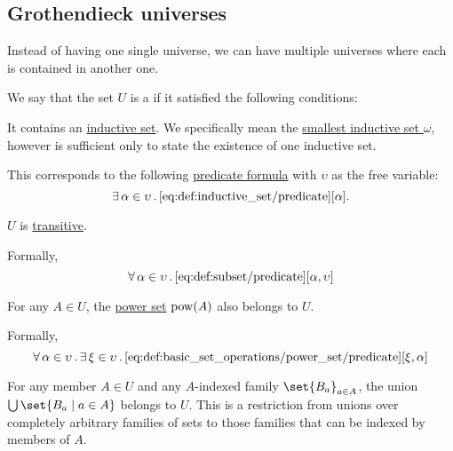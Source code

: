 \subsection{Grothendieck universes}\label{subsec:grothendieck_universes}

Instead of having one single universe, we can have multiple universes where each is contained in another one.

\begin{definition}\label{def:grothendieck_universe}
  We say that the set \( U \) is a  if it satisfied the following conditions:
  \begin{thmenum}
     It contains an \hyperref[def:inductive_set]{inductive set}. We specifically mean the \hyperref[thm:smallest_inductive_set_existence_existence]{smallest inductive set \( \omega \)}, however is sufficient only to state the existence of one inductive set.

    This corresponds to the following \hyperref[rem:predicate_formula]{predicate formula} with \( \upsilon \) as the free variable:
    \begin{equation}\label{eq:def:grothendieck_universe/inductive}
      \exists \thinspace \alpha \in \upsilon \thinspace . \thinspace \ref{eq:def:inductive_set/predicate}[\alpha].
    \end{equation}

     \( U \) is \hyperref[def:transitive_set]{transitive}.

    Formally,
    \begin{equation}\label{eq:def:grothendieck_universe/transitive}
      \forall \thinspace \alpha \in \upsilon \thinspace . \thinspace \ref{eq:def:subset/predicate}[\alpha, \upsilon]
    \end{equation}

     For any \( A \in U \), the \hyperref[def:basic_set_operations/power_set]{power set} \( \operatorname{pow}(A) \) also belongs to \( U \).

    Formally,
    \begin{equation}\label{eq:def:grothendieck_universe/power_set}
      \forall \thinspace \alpha \in \upsilon \thinspace . \thinspace \exists \thinspace \xi \in \upsilon \thinspace . \thinspace \ref{eq:def:basic_set_operations/power_set/predicate}[\xi, \alpha]
    \end{equation}

     For any member \( A \in U \) and any \( A \)-indexed family \( \set{ B_a }_{a \in A} \), the union \( \bigcup\set{ B_a \given a \in A } \) belongs to \( U \). This is a restriction from unions over completely arbitrary families of sets to those families that can be indexed by members of \( A \).


\end{thmenum}
\end{definition}
